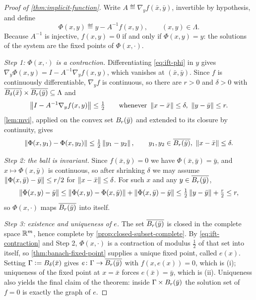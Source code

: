 \begin{proof}[Proof of \autoref{thm:implicit-function}]
	Write $A\eqdef\nabla_yf(\bar x,\bar y)$, invertible by hypothesis, and define
	\begin{equation}\label{eq:ift-phi}
		\Phi(x,y)\eqdef y-A^{-1}f(x,y),\qquad(x,y)\in\Lambda .
	\end{equation}
	Because $A^{-1}$ is injective, $f(x,y)=0$ if and only if $\Phi(x,y)=y$: the
	solutions of the system are the fixed points of $\Phi(x,\cdot)$.

	\emph{Step 1: $\Phi(x,\cdot)$ is a contraction.} Differentiating
	\eqref{eq:ift-phi} in $y$ gives
	$\nabla_y\Phi(x,y)=I-A^{-1}\nabla_yf(x,y)$, which vanishes at
	$(\bar x,\bar y)$. Since $f$ is continuously differentiable, $\nabla_yf$ is
	continuous, so there are $r>0$ and $\delta>0$ with
	$\overline{B_{\delta}(\bar x)}\times\overline{B_{r}(\bar y)}\subseteq\Lambda$
	and
	\begin{equation}\label{eq:ift-half}
		\left\lVert I-A^{-1}\nabla_yf(x,y)\right\rVert\leq\tfrac12
		\qquad\text{whenever }\left\lVert x-\bar x\right\rVert\leq\delta,\ \left\lVert y-\bar y\right\rVert\leq r .
	\end{equation}
	\autoref{lem:mvi}, applied on the convex set $B_{r}(\bar y)$ and extended to
	its closure by continuity, gives
	\begin{equation}\label{eq:ift-contraction}
		\left\lVert\Phi(x,y_1)-\Phi(x,y_2)\right\rVert\leq\tfrac12\left\lVert y_1-y_2\right\rVert,
		\qquad y_1,y_2\in\overline{B_{r}(\bar y)},\ \left\lVert x-\bar x\right\rVert\leq\delta .
	\end{equation}

	\emph{Step 2: the ball is invariant.} Since $f(\bar x,\bar y)=0$ we have
	$\Phi(\bar x,\bar y)=\bar y$, and $x\mapsto\Phi(x,\bar y)$ is continuous, so
	after shrinking $\delta$ we may assume
	$\left\lVert\Phi(x,\bar y)-\bar y\right\rVert\leq r/2$ for $\left\lVert x-\bar x\right\rVert\leq\delta$. For such
	$x$ and any $y\in\overline{B_{r}(\bar y)}$,
	\[
		\left\lVert\Phi(x,y)-\bar y\right\rVert
		\leq\left\lVert\Phi(x,y)-\Phi(x,\bar y)\right\rVert+\left\lVert\Phi(x,\bar y)-\bar y\right\rVert
		\leq\tfrac12\left\lVert y-\bar y\right\rVert+\tfrac{r}{2}\leq r,
	\]
	so $\Phi(x,\cdot)$ maps $\overline{B_{r}(\bar y)}$ into itself.

	\emph{Step 3: existence and uniqueness of $e$.} The set
	$\overline{B_{r}(\bar y)}$ is closed in the complete space $\mathbb{R}^{m}$, hence
	complete by \autoref{prop:closed-subset-complete}. By
	\eqref{eq:ift-contraction} and Step 2, $\Phi(x,\cdot)$ is a contraction of
	modulus $\tfrac12$ of that set into itself, so
	\autoref{thm:banach-fixed-point} supplies a unique fixed point, called $e(x)$.
	Setting $\Gamma\mathrel{\vcentcolon=}B_{\delta}(\bar x)$ gives
	$e\colon\Gamma\to\overline{B_{r}(\bar y)}$ with $f(x,e(x))=0$, which is (i);
	uniqueness of the fixed point at $x=\bar x$ forces $e(\bar x)=\bar y$, which is
	(ii). Uniqueness also yields the final claim of the theorem: inside
	$\Gamma\times B_{r}(\bar y)$ the solution set of $f=0$ is exactly the graph of
	$e$.


\end{proof}
